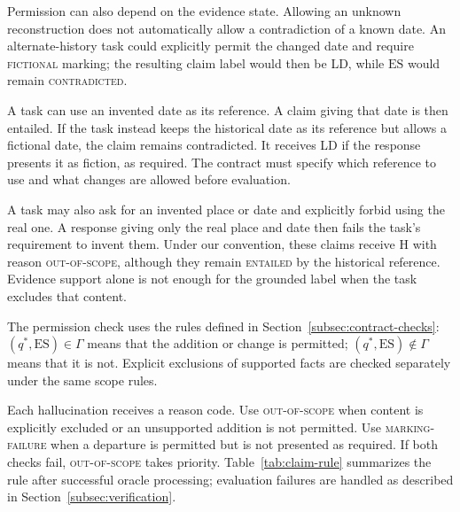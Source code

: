 \documentclass{clv2025}
\newcommand{\LD}{\textsc{LD}}
\newcommand{\Hall}{\textsc{H}}
\begin{document}
Permission can also depend on the evidence state. Allowing an unknown
reconstruction does not automatically allow a contradiction of a known date.
An alternate-history task could explicitly permit the changed date and
require \textsc{fictional} marking; the resulting claim label would then be \LD{}, while $\mathrm{ES}$ would
remain \textsc{contradicted}.

A task can use an invented date as its reference. A claim giving that date
is then entailed. If the task instead keeps the historical date as its
reference but allows a fictional date, the claim remains contradicted.
It receives \LD{} if the response presents it as fiction, as required.
The contract must specify which reference to use and what changes are
allowed before evaluation.

A task may also ask for an invented place or date and explicitly forbid
using the real one. A response giving only the real place and date then
fails the task's requirement to invent them. Under our convention, these
claims receive \Hall{} with reason \textsc{out-of-scope}, although they
remain \textsc{entailed} by the historical reference. Evidence support
alone is not enough for the grounded label when the task excludes that
content.

The permission check uses the rules defined in Section~\ref{subsec:contract-checks}:
$(q^*,\mathrm{ES})\in\Gamma$ means that the addition or change is permitted;
$(q^*,\mathrm{ES})\notin\Gamma$ means that it is not. Explicit exclusions
of supported facts are checked separately under the same scope rules.

Each hallucination receives a reason code. Use \textsc{out-of-scope} when
content is explicitly excluded or an unsupported addition is not permitted. Use
\textsc{marking-failure} when a departure is permitted but is not presented
as required. If both checks fail, \textsc{out-of-scope} takes priority.
Table~\ref{tab:claim-rule} summarizes the rule after successful oracle
processing; evaluation failures are handled as described in
Section~\ref{subsec:verification}.
\end{document}
